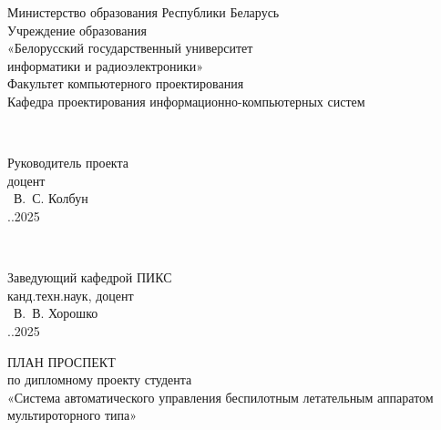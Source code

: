 \begin{titlepage}
\begin{center}
Министерство образования Республики Беларусь\\
Учреждение образования\\
«Белорусский государственный университет \\
информатики и радиоэлектроники»\\[1.2em]

Факультет компьютерного проектирования\\
Кафедра проектирования информационно-компьютерных систем\\
\end{center}

\vfill



\begin{minipage}{8cm}
  \begin{flushleft}
    \\
    \raggedright %
    Руководитель проекта\\
    доцент\\
    \underline{\hspace*{2cm}} ~В.~С. Колбун\\
    \underline{\hspace*{0.5cm}}.\underline{\hspace*{0.5cm}}.2025\\
  \end{flushleft}
\end{minipage}
\hfill
\begin{minipage}{8cm}
  \begin{flushright}
    \\
    \raggedright
    Заведующий кафедрой ПИКС\\
    канд.техн.наук, доцент\\
    \underline{\hspace*{2cm}} ~В.~В. Хорошко\\
    \underline{\hspace*{0.5cm}}.\underline{\hspace*{0.5cm}}.2025\\
  \end{flushright}
\end{minipage}


\vfill
\begin{center}
  ПЛАН ПРОСПЕКТ\\
  по дипломному проекту студента\\
  «Система автоматического управления беспилотным летательным аппаратом мультироторного типа»
\end{center}


\end{titlepage}
